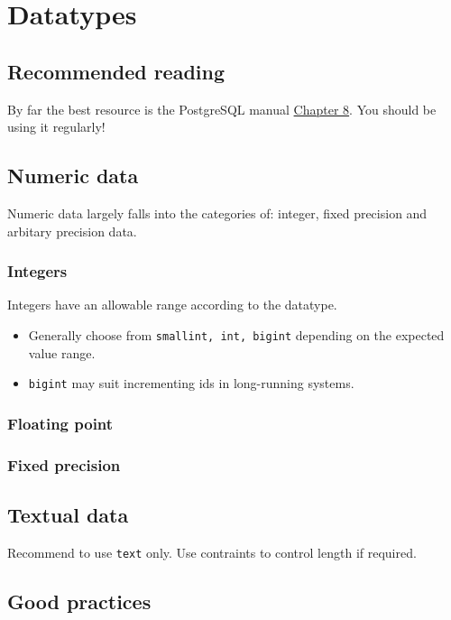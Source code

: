 \chapter{Datatypes}
\label{ch:datatypes}

\section*{Recommended reading}

By far the best resource is the PostgreSQL manual \href{https://www.postgresql.org/docs/current/datatype.html}{Chapter 8}.
You should be using it regularly!

\section{Numeric data}

Numeric data largely falls into the categories of: integer, fixed precision and arbitary precision data.

\subsection{Integers}

Integers have an allowable range according to the datatype.
\begin{itemize}
\item Generally choose from \texttt{smallint, int, bigint} depending on the expected value range. 
\item \texttt{bigint} may suit incrementing ids in long-running systems.
\end{itemize}

\subsection{Floating point}

\subsection{Fixed precision}

\section{Textual data}

Recommend to use \texttt{text} only.
Use contraints to control length if required. 

\section{Good practices}

